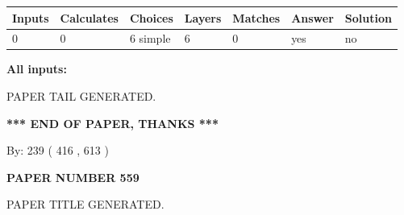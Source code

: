 \documentclass[12pt]{article}
\begin{document}
   
   
   
\noindent\begin{tabular}{|l|l|l|l|l|l|l|}
 \hline
Inputs & Calculates & Choices & Layers & Matches & Answer & Solution \\ \hline
 0  & 
 0  & 
 6
  simple  
  & 
 6  & 
 0  & 
  yes & 
  no 
  \\ \hline
 \end{tabular}
   
   
   
   
\noindent{}
   
   
   
   
\noindent\vspace{0.1in}\hspace{-0.08in} {\textbf{\Large{All inputs: }}}
   
   
   
   
   
   
 \vspace{0.2in}
 
   
   
\vspace{2.0in} PAPER TAIL GENERATED.
   
   
   
   
\vspace{1.0in} 
{\textbf{\large{ *** END OF PAPER, THANKS *** }}} 
   
   
\hspace{1.0in} By: 
 239 ( 416 ,  613 )
   
   
   
   
\newpage 
\setcounter{page}{ 
   559001 } 
   
   
   
   
 {\textbf{ \Large{ PAPER NUMBER  559  }}}
   
   
\vspace{0.2in}
   
   
   
   
   
   
   
   
 \vspace{0.2in}
 
 
 
 
   
   
 PAPER TITLE GENERATED.
   
   
   
\end{document}

